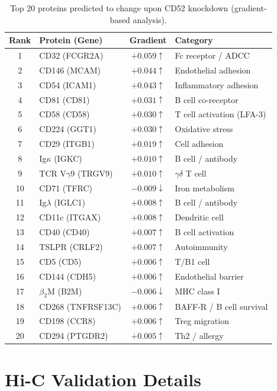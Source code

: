 \documentclass{article}
\begin{document}
\begin{table}[H]
\centering
\small
\caption{Top 20 proteins predicted to change upon CD52 knockdown (gradient-based analysis).}
\begin{tabular}{clcl}
\toprule
Rank & Protein (Gene) & Gradient & Category \\
\midrule
1 & CD32 (FCGR2A) & $+0.059\uparrow$ & Fc receptor / ADCC \\
2 & CD146 (MCAM) & $+0.044\uparrow$ & Endothelial adhesion \\
3 & CD54 (ICAM1) & $+0.043\uparrow$ & Inflammatory adhesion \\
4 & CD81 (CD81) & $+0.031\uparrow$ & B cell co-receptor \\
5 & CD58 (CD58) & $+0.030\uparrow$ & T cell activation (LFA-3) \\
6 & CD224 (GGT1) & $+0.030\uparrow$ & Oxidative stress \\
7 & CD29 (ITGB1) & $+0.019\uparrow$ & Cell adhesion \\
8 & Ig$\kappa$ (IGKC) & $+0.010\uparrow$ & B cell / antibody \\
9 & TCR V$\gamma$9 (TRGV9) & $+0.010\uparrow$ & $\gamma\delta$ T cell \\
10 & CD71 (TFRC) & $-0.009\downarrow$ & Iron metabolism \\
11 & Ig$\lambda$ (IGLC1) & $+0.008\uparrow$ & B cell / antibody \\
12 & CD11c (ITGAX) & $+0.008\uparrow$ & Dendritic cell \\
13 & CD40 (CD40) & $+0.007\uparrow$ & B cell activation \\
14 & TSLPR (CRLF2) & $+0.007\uparrow$ & Autoimmunity \\
15 & CD5 (CD5) & $+0.006\uparrow$ & T/B1 cell \\
16 & CD144 (CDH5) & $+0.006\uparrow$ & Endothelial barrier \\
17 & $\beta_2$M (B2M) & $-0.006\downarrow$ & MHC class I \\
18 & CD268 (TNFRSF13C) & $+0.006\uparrow$ & BAFF-R / B cell survival \\
19 & CD198 (CCR8) & $+0.006\uparrow$ & Treg migration \\
20 & CD294 (PTGDR2) & $+0.005\uparrow$ & Th2 / allergy \\
\bottomrule
\end{tabular}
\label{tab:cd52_full}
\end{table}

\section{Hi-C Validation Details}
\label{app:hic}
\end{document}
